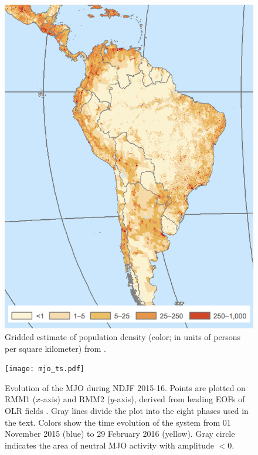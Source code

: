 \documentclass{article}
\begin{document}
\clearpage

\begin{figure}
	\centering
  \includegraphics[width=\textwidth,height=0.6\textheight,keepaspectratio=true]{gpw-v4-2015.png}
	\caption{
		Gridded estimate of population density (color; in units of persons per square kilometer) from \citet{GPWv4}.
	}
\end{figure}

\begin{figure}
	\texttt{[image: mjo\_ts.pdf]}
	\caption{
		Evolution of the MJO during NDJF 2015-16.
		Points are plotted on RMM1 ($x$-axis) and RMM2 ($y$-axis), derived from leading EOFs of OLR fields \citep{Wheeler2004}.
		Gray lines divide the plot into the eight phases used in the text.
		Colors show the time evolution of the system from 01 November 2015 (blue) to 29 February 2016 (yellow).
		Gray circle indicates the area of neutral MJO activity with amplitude $<0$.
	}
\end{figure}
\end{document}

